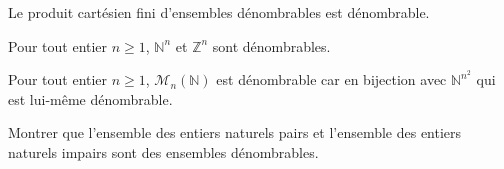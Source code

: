 \documentclass[a4paper,10pt]{report}
\begin{document}
\vspace{6cm}

\begin{prop} Le produit cartésien fini d'ensembles dénombrables est dénombrable.
\end{prop} 

\begin{preuve}

\vspace{6cm}
\end{preuve}



\begin{exems}
\item Pour tout entier $n \geq 1$, $\mathbb{N}^n$ et $\mathbb{Z}^n$ sont dénombrables.
\item Pour tout entier $n \geq 1$, $\mathcal{M}_n(\mathbb{N})$ est dénombrable car en bijection avec $\mathbb{N}^{n^2}$ qui est lui-même dénombrable.
\end{exems}

\begin{exa} Montrer que l'ensemble des entiers naturels pairs et l'ensemble des entiers naturels impairs sont des ensembles dénombrables.
\end{exa}
\end{document}
